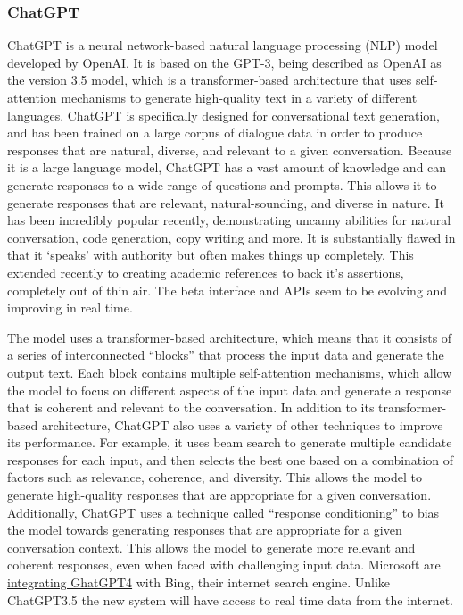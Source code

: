 \subsubsection{ChatGPT}
ChatGPT is a neural network-based natural language processing (NLP) model developed by OpenAI. It is based on the GPT-3, being described as OpenAI as the version 3.5 model, which is a transformer-based architecture that uses self-attention mechanisms to generate high-quality text in a variety of different languages. ChatGPT is specifically designed for conversational text generation, and has been trained on a large corpus of dialogue data in order to produce responses that are natural, diverse, and relevant to a given conversation. Because it is a large language model, ChatGPT has a vast amount of knowledge and can generate responses to a wide range of questions and prompts. This allows it to generate responses that are relevant, natural-sounding, and diverse in nature. It has been incredibly popular recently, demonstrating uncanny abilities for natural conversation, code generation, copy writing and more. It is substantially flawed in that it `speaks' with authority but often makes things up completely. This extended recently to creating academic references to back it's assertions, completely out of thin air. The beta interface and APIs seem to be evolving and improving in real time.\par
The model uses a transformer-based architecture, which means that it consists of a series of interconnected ``blocks'' that process the input data and generate the output text. Each block contains multiple self-attention mechanisms, which allow the model to focus on different aspects of the input data and generate a response that is coherent and relevant to the conversation. In addition to its transformer-based architecture, ChatGPT also uses a variety of other techniques to improve its performance. For example, it uses beam search to generate multiple candidate responses for each input, and then selects the best one based on a combination of factors such as relevance, coherence, and diversity. This allows the model to generate high-quality responses that are appropriate for a given conversation. Additionally, ChatGPT uses a technique called ``response conditioning'' to bias the model towards generating responses that are appropriate for a given conversation context. This allows the model to generate more relevant and coherent responses, even when faced with challenging input data. Microsoft are \href{https://medium.com/@owenyin/scoop-oh-the-things-youll-do-with-bing-s-chatgpt-62b42d8d7198}{integrating GhatGPT4} with Bing, their internet search engine. Unlike ChatGPT3.5 the new system will have access to real time data from the internet.
